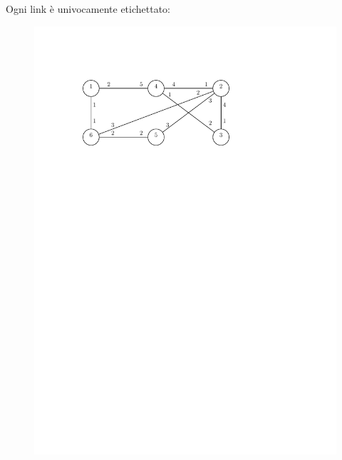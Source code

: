 \documentclass[10pt,xcolor=dvipsnames]{beamer}
\begin{document}
\begin{frame}{}
	Ogni link è univocamente etichettato:
	\vfill
	\begin{figure}[h]
	\centering
	\includegraphics[scale=0.8]{example_graph.pdf}
	\end{figure}
\end{frame}
\end{document}
